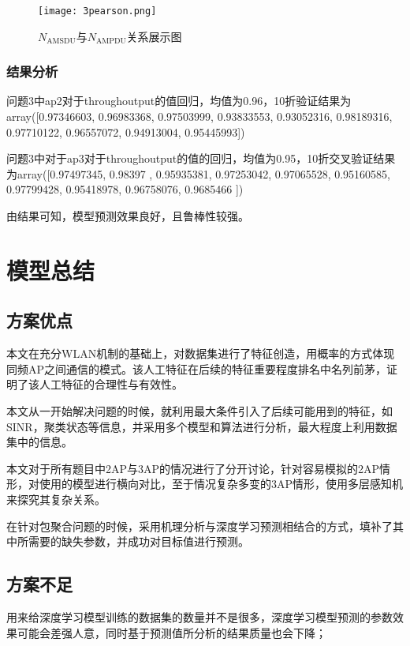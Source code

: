 \documentclass[bwprint]{gmcmthesis}
\begin{document}
\begin{figure}[!htbp]
    \centering
    \texttt{[image: 3pearson.png]}
    \caption{\centering $N_{\text{AMSDU}}$与$N_{\text{AMPDU}}$关系展示图}
    \label{pho:3pearson}
\end{figure}

\subsubsection{结果分析}

问题3中ap2对于throughoutput的值回归，均值为0.96，10折验证结果为array([0.97346603, 0.96983368, 0.97503999, 0.93833553, 0.93052316,
       0.98189316, 0.97710122, 0.96557072, 0.94913004, 0.95445993])

问题3中对于ap3对于throughoutput的值的回归，均值为0.95，10折交叉验证结果为array([0.97497345, 0.98397   , 0.95935381, 0.97253042, 0.97065528,
0.95160585, 0.97799428, 0.95418978, 0.96758076, 0.9685466 ])

由结果可知，模型预测效果良好，且鲁棒性较强。

\newpage
\section{模型总结}

\subsection{方案优点}

本文在充分WLAN机制的基础上，对数据集进行了特征创造，用概率的方式体现同频AP之间通信的模式。该人工特征在后续的特征重要程度排名中名列前茅，证明了该人工特征的合理性与有效性。

本文从一开始解决问题的时候，就利用最大条件引入了后续可能用到的特征，如SINR，聚类状态等信息，并采用多个模型和算法进行分析，最大程度上利用数据集中的信息。

本文对于所有题目中2AP与3AP的情况进行了分开讨论，针对容易模拟的2AP情形，对使用的模型进行横向对比，至于情况复杂多变的3AP情形，使用多层感知机来探究其复杂关系。

在针对包聚合问题的时候，采用机理分析与深度学习预测相结合的方式，填补了其中所需要的缺失参数，并成功对目标值进行预测。

\subsection{方案不足}

用来给深度学习模型训练的数据集的数量并不是很多，深度学习模型预测的参数效果可能会差强人意，同时基于预测值所分析的结果质量也会下降；
\end{document}
